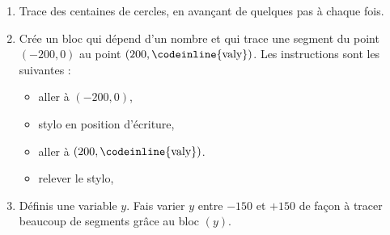 \documentclass[class=report,crop=false, 12pt]{standalone}
\begin{document}
\begin{activite}
\begin{enumerate}
  \item Trace des centaines de cercles, en avançant de quelques pas à chaque fois.
  
  \item Crée un bloc  qui dépend d'un nombre
  et qui trace une segment du point $(-200,0)$ au point $(200,\text{\codeinline{valy}})$. Les instructions sont les suivantes :
    \begin{itemize}      
      \item aller à $(-200,0)$,
      \item stylo en position d'écriture,
      \item aller à $(200,\text{\codeinline{valy}})$.
      \item relever le stylo,
    \end{itemize}   
  
  \item Définis une variable $y$. Fais varier $y$ entre $-150$ et $+150$ de façon à tracer beaucoup de segments grâce au bloc  $(y)$.  
    
\end{enumerate}
  
\end{activite}
\end{document}
